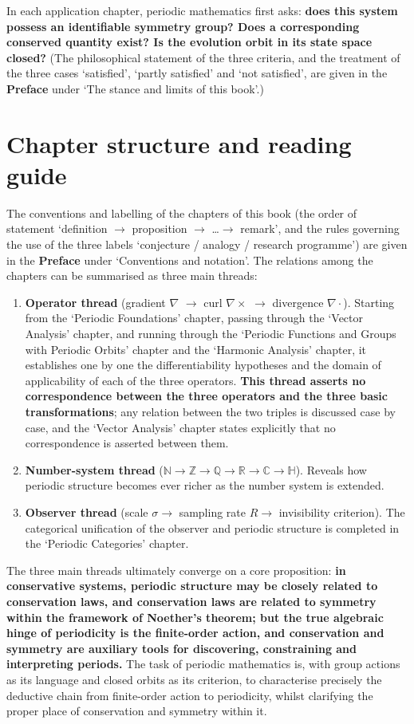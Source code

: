In each application chapter, periodic mathematics first asks: \textbf{does this system possess an identifiable symmetry group? Does a corresponding conserved quantity exist? Is the evolution orbit in its state space closed?} (The philosophical statement of the three criteria, and the treatment of the three cases `satisfied', `partly satisfied' and `not satisfied', are given in the \textbf{Preface} under `The stance and limits of this book'.)

\section*{Chapter structure and reading guide}

The conventions and labelling of the chapters of this book (the order of statement `definition $\to$ proposition $\to$ \dots $\to$ remark', and the rules governing the use of the three labels `conjecture / analogy / research programme') are given in the \textbf{Preface} under `Conventions and notation'. The relations among the chapters can be summarised as three main threads:

\begin{enumerate}[leftmargin=4em, label={(\arabic*)}]
    \item \textbf{Operator thread} (gradient $\nabla$ $\to$ curl $\nabla\times$ $\to$ divergence $\nabla\cdot$). Starting from the `Periodic Foundations' chapter, passing through the `Vector Analysis' chapter, and running through the `Periodic Functions and Groups with Periodic Orbits' chapter and the `Harmonic Analysis' chapter, it establishes one by one the differentiability hypotheses and the domain of applicability of each of the three operators. \textbf{This thread asserts no correspondence between the three operators and the three basic transformations}; any relation between the two triples is discussed case by case, and the `Vector Analysis' chapter states explicitly that no correspondence is asserted between them.
    \item \textbf{Number-system thread} ($\mathbb{N} \to \mathbb{Z} \to \mathbb{Q} \to \mathbb{R} \to \mathbb{C} \to \mathbb{H}$). Reveals how periodic structure becomes ever richer as the number system is extended.
    \item \textbf{Observer thread} (scale $\sigma \to$ sampling rate $R \to$ invisibility criterion). The categorical unification of the observer and periodic structure is completed in the `Periodic Categories' chapter.
\end{enumerate}

The three main threads ultimately converge on a core proposition: \textbf{in conservative systems, periodic structure may be closely related to conservation laws, and conservation laws are related to symmetry within the framework of Noether's theorem; but the true algebraic hinge of periodicity is the finite-order action, and conservation and symmetry are auxiliary tools for discovering, constraining and interpreting periods.} The task of periodic mathematics is, with group actions as its language and closed orbits as its criterion, to characterise precisely the deductive chain from finite-order action to periodicity, whilst clarifying the proper place of conservation and symmetry within it.

